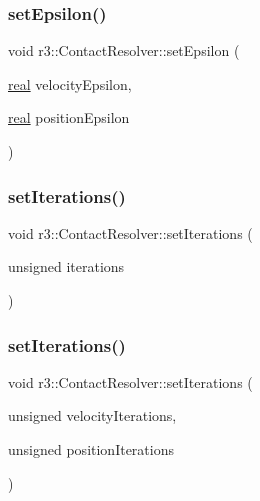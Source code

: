 \mbox{\label{classr3_1_1_contact_resolver_a699cd63e020c47c52223efa1494bdfae}} 
\subsubsection{\texorpdfstring{set\+Epsilon()}{setEpsilon()}}
{\footnotesize\ttfamily void r3\+::\+Contact\+Resolver\+::set\+Epsilon (\begin{DoxyParamCaption}\item[{\mbox{\hyperlink{namespacer3_ab2016b3e3f743fb735afce242f0dc1eb}{real}}}]{velocity\+Epsilon,  }\item[{\mbox{\hyperlink{namespacer3_ab2016b3e3f743fb735afce242f0dc1eb}{real}}}]{position\+Epsilon }\end{DoxyParamCaption})}

\mbox{\label{classr3_1_1_contact_resolver_aba01b66ae9ff4b713b65142466d3f98d}} 
\subsubsection{\texorpdfstring{set\+Iterations()}{setIterations()}\hspace{0.1cm}{\footnotesize\ttfamily [1/2]}}
{\footnotesize\ttfamily void r3\+::\+Contact\+Resolver\+::set\+Iterations (\begin{DoxyParamCaption}\item[{unsigned}]{iterations }\end{DoxyParamCaption})}

\mbox{\label{classr3_1_1_contact_resolver_a661c4b7d7ba2232f16691e159601401f}} 
\subsubsection{\texorpdfstring{set\+Iterations()}{setIterations()}\hspace{0.1cm}{\footnotesize\ttfamily [2/2]}}
{\footnotesize\ttfamily void r3\+::\+Contact\+Resolver\+::set\+Iterations (\begin{DoxyParamCaption}\item[{unsigned}]{velocity\+Iterations,  }\item[{unsigned}]{position\+Iterations }\end{DoxyParamCaption})}



